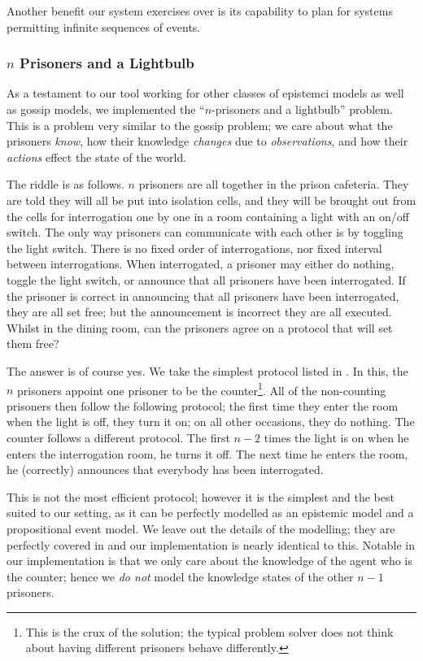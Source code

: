 \documentclass[10pt, a4paper]{report}
\begin{document}
Another benefit our system exercises over \cite{GithubGossip} is its capability
to plan for systems permitting infinite sequences of events. 

\subsubsection{$n$ Prisoners and a Lightbulb}
\label{sec:Prisoners}

As a testament to our tool working for other classes of epistemci models as well
as gossip models, we implemented the ``$n$-prisoners and a lightbulb'' problem.
This is a problem very similar to the gossip problem; we care about what the
prisoners \emph{know}, how their knowledge \emph{changes} due to
\emph{observations}, and how their \emph{actions} effect the state of the world. 

The riddle is as follows. $n$ prisoners are all together in the prison
cafeteria. They are told they will all be put into isolation cells, and they
will be brought out from the cells for interrogation one by one in a room
containing a light with an on/off switch. The only way prisoners can communicate
with each other is by toggling the light switch. There is no fixed order of
interrogations, nor fixed interval between interrogations. When interrogated, a
prisoner may either do nothing, toggle the light switch, or announce that all
prisoners have been interrogated. If the prisoner is correct in announcing that
all prisoners have been interrogated, they are all set free; but the
announcement is incorrect they are all executed. Whilst in the dining room, can
the prisoners agree on a protocol that will set them free? 

The answer is of course yes. We take the simplest protocol listed in
\cite{Prisoners}. In this, the $n$ prisoners appoint one prisoner to be the
counter\footnote{This is the crux of the solution; the typical problem solver
  does not think about having different prisoners behave differently.}. All of
the non-counting prisoners then follow the following protocol; the first time
they enter the room when the light is off, they turn it on; on all other
occasions, they do nothing. The counter follows a different protocol. The first
$n - 2$ times the light is on when he enters the interrogation room, he turns it
off. The next time he enters the room, he (correctly) announces that everybody
has been interrogated.

This is not the most efficient protocol; however it is the simplest and the best
suited to our setting, as it can be perfectly modelled as an epistemic model and
a propositional event model. We leave out the details of the modelling; they are
perfectly covered in \cite{Prisoners} and our implementation is nearly identical
to this. Notable in our implementation is that we only care about the knowledge
of the agent who is the counter; hence we \emph{do not} model the knowledge
states of the other $n - 1$ prisoners. 
\end{document}
